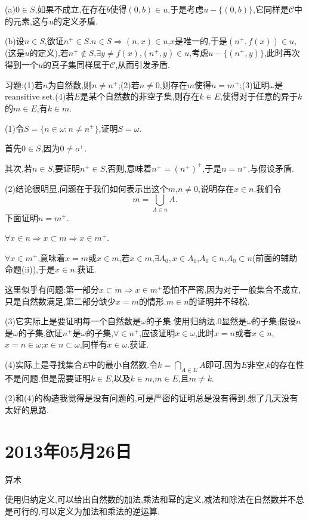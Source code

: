 \documentclass[12pt,a4paper,openany]{book}
\begin{document}
(a)$0 \in S$,如果不成立,在存在$b$使得$(0,b) \in u$,于是考虑$u - \{(0,b)\}$,它同样是$\mathscr{C}$中的元素,这与$u$的定义矛盾.

(b)设$n \in S$,欲证$n^+ \in S$.$n \in S$$\Rightarrow$$(n,x) \in u$,$x$是唯一的,于是$(n^+,f(x)) \in u$,(这是$u$的定义),若$n^+ \notin S$,$\exists y \neq f(x)$,$(n^+,y) \in u$,考虑$u-\{(n^+,y)\}$,此时再次得到一个$u$的真子集同样属于$\mathscr{C}$,从而引发矛盾.

习题:(1)若$n$为自然数,则$n \neq n^+$;(2)若$n \neq 0$,则存在$m$使得$n=m^+$;(3)证明$\omega$是reansitive set.(4)若$E$是某个自然数的非空子集,则存在$k \in E$,使得对于任意的异于$k$的$m \in E$,有$k \in m$.

(1)令$S = \{n \in \omega:n \neq n^+\}$,证明$S=\omega$.

首先$0 \in S$,因为$0 \neq o^+$.

其次,若$n \in S$,要证明$n^+ \in S$,否则,意味着$n^+=(n^+)^+$,于是$n=n^+$,与假设矛盾.

(2)结论很明显,问题在于我们如何表示出这个$m$,$n \neq 0$,说明存在$x \in n$.我们令
\[
m = \bigcup_{A \in n}{A}.
\]
下面证明$n=m^+$.

$\forall x \in n$$\Rightarrow$$x \subset m$$\Rightarrow$$x \in m^+$.

$\forall x \in m^+$,意味着$x=m$或$x \in m$,若$x \in m$,$\exists A_0, x \in A_0$,$A_0 \in n$,$A_0 \subset n$(前面的辅助命题(ii)),于是$x \in n$.获证.

这里似乎有问题:第一部分$x \subset m$$\Rightarrow$$x \in m^+$恐怕不严密,因为对于一般集合不成立,只是自然数满足,第二部分缺少$x=m$的情形.$m \in n$的证明并不轻松.

(3)它实际上是要证明每一个自然数是$\omega$的子集.使用归纳法.$0$显然是$\omega$的子集;假设$n$是$\omega$的子集,欲证$n^+$是$\omega$的子集,$\forall \in n^+$,应该证明$x \in \omega$,此时$x=n$或者$x \in n$,$x=n \in \omega$;$x \in n \subset \omega$,同样有$x \in \omega$.获证.

(4)实际上是寻找集合$E$中的最小自然数.令$k=\bigcap_{A \in E}{A}$即可.因为$E$非空,$k$的存在性不是问题.但是需要证明$k \in E$,以及$k \in m$,$m \in E$,且$m \neq k$.

(2)和(4)的构造我觉得是没有问题的,可是严密的证明总是没有得到,想了几天没有太好的思路.

\section{2013年05月26日}
算术

使用归纳定义,可以给出自然数的加法,乘法和幂的定义,减法和除法在自然数并不总是可行的,可以定义为加法和乘法的逆运算.
\end{document}
